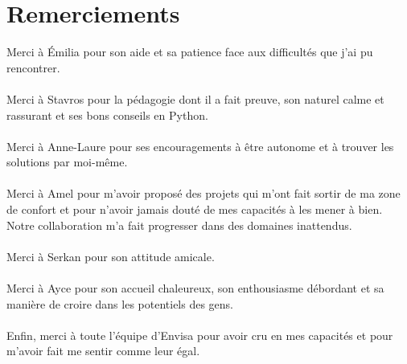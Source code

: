 \documentclass[a4paper,12pt,twoside]{article}
\begin{document}
	
    
    \section*{Remerciements}
    \thispagestyle{empty}
    Merci à \'Emilia pour son aide et sa patience face aux difficultés que j'ai pu rencontrer.
	\\\\
    Merci à Stavros pour la pédagogie dont il a fait preuve, son naturel calme et rassurant et ses bons conseils en Python.
    \\\\
    Merci à Anne-Laure pour ses encouragements à être autonome et à trouver les solutions par moi-même.
    \\\\
    Merci à Amel pour m'avoir proposé des projets qui m'ont fait sortir de ma zone de confort et pour n'avoir jamais douté de mes capacités à les mener à bien. Notre collaboration m'a fait progresser dans des domaines inattendus.
    \\\\
    Merci à Serkan pour son attitude amicale.
    \\\\
    Merci à Ayce pour son accueil chaleureux, son enthousiasme débordant et sa manière de croire dans les potentiels des gens.
    \\\\
    Enfin, merci à toute l'équipe d'Envisa pour avoir cru en mes capacités et pour m'avoir fait me sentir comme leur égal.
    \clearpage
    \newpage
    
    \tableofcontents
    \listoffigures
    \listoftables
    \sloppy
    \newpage
    
\end{document}
